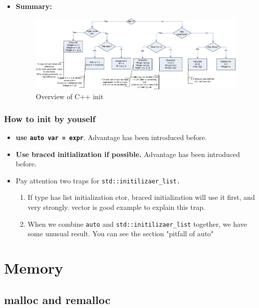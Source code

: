 \documentclass[a4paper,11pt,twoside]{book}
\begin{document}
\begin{itemize}
	\item \textbf{Summary:}
	\begin{figure}[h]
		\centering
		\includegraphics[width=0.95\linewidth]{pics/init.png}
		\caption{Overview of C++ init}
		\label{fig:command}
	\end{figure}
	
\end{itemize}

\subsection{How to init by youself}
\begin{itemize}

	\item \textbf{use \texttt{auto var = expr}}. Advantage has been introduced before.

	\item \textbf{Use braced initialization if possible.} Advantage has been introduced before.

	\item Pay attention two traps for \texttt{std::initilizaer\_list.} 
	\begin{enumerate}
		\item If type has list initialization ctor, braced initialization will use it first, and very strongly. vector is good example to explain this trap.
		
		\item When we combine \texttt{auto} and \texttt{std::initilizaer\_list} together, we have some unusual result. You can see the section "pitfall of auto" 
	\end{enumerate}
\end{itemize}


\chapter{Memory}

\section{malloc and remalloc}
\end{document}
